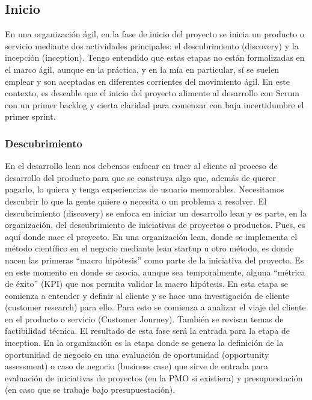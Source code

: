 \subsection{Inicio}

En una organización ágil, en la fase de inicio del proyecto se inicia un producto o servicio mediante dos actividades principales: el descubrimiento (discovery) y la incepción (inception). Tengo entendido que estas etapas no están formalizadas en el marco ágil, aunque en la práctica, y en la mía en particular, sí se suelen emplear y son aceptadas en diferentes corrientes del movimiento ágil. En este contexto, es deseable que el inicio del proyecto alimente al desarrollo con Scrum con un primer backlog y cierta claridad para comenzar con baja incertidumbre el primer sprint. 

\subsubsection{Descubrimiento}

En el desarrollo lean nos debemos enfocar en traer al cliente al proceso de desarrollo del producto para que se construya algo que, además de querer pagarlo, lo quiera y tenga experiencias de usuario memorables. Necesitamos descubrir lo que la gente quiere o necesita o un problema a resolver. El descubrimiento (discovery) se enfoca en iniciar un desarrollo lean y es parte, en la organización, del descubrimiento de iniciativas de proyectos o productos. Pues, es aquí donde nace el proyecto. En una organización lean, donde se implementa el método científico en el negocio mediante lean startup u otro método, es donde nacen las primeras “macro hipótesis” como parte de la iniciativa del proyecto. Es en este momento en donde se asocia, aunque sea temporalmente, alguna “métrica de éxito” (KPI) que nos permita validar la macro hipótesis. En esta etapa se comienza a entender y definir al cliente y se hace una investigación de cliente (customer research) para ello. Para esto se comienza a analizar el viaje del cliente en el producto o servicio (Customer Journey). También se revisan temas de factibilidad técnica. El resultado de esta fase será la entrada para la etapa de inception. En la organización es la etapa donde se genera la definición de la oportunidad de negocio en una evaluación de oportunidad (opportunity assessment) o caso de negocio (business case) que sirve de entrada para evaluación de iniciativas de proyectos (en la PMO si existiera) y presupuestación (en caso que se trabaje bajo presupuestación).

